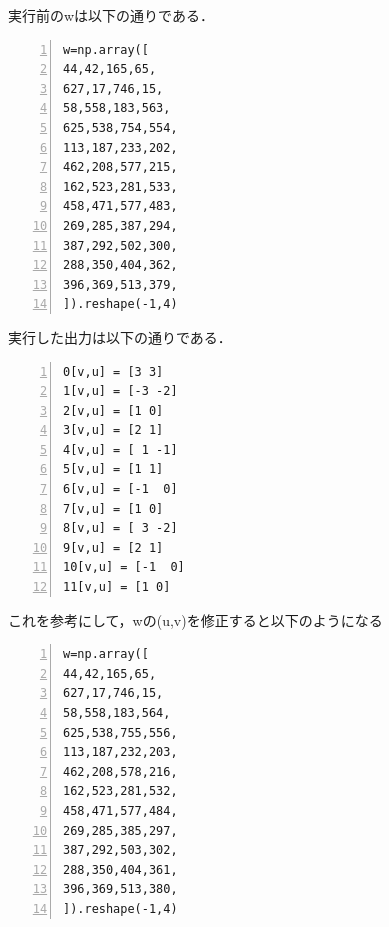 \documentclass[autodetect-engine,dvi=dvipdfmx,ja=standard,
               a4j,11pt]{bxjsarticle}
\begin{document}
実行前のwは以下の通りである．
\begin{Verbatim}[numbers=left, xleftmargin=10mm, numbersep=6pt,
                    fontsize=\small, baselinestretch=0.8]
  w=np.array([
44,42,165,65,
627,17,746,15,
58,558,183,563,
625,538,754,554,
113,187,233,202,
462,208,577,215,
162,523,281,533,
458,471,577,483,
269,285,387,294,
387,292,502,300,
288,350,404,362,
396,369,513,379,
]).reshape(-1,4)
\end{Verbatim}
実行した出力は以下の通りである．
\begin{Verbatim}[numbers=left, xleftmargin=10mm, numbersep=6pt,
                    fontsize=\small, baselinestretch=0.8]
0[v,u] = [3 3]
1[v,u] = [-3 -2]
2[v,u] = [1 0]
3[v,u] = [2 1]
4[v,u] = [ 1 -1]
5[v,u] = [1 1]
6[v,u] = [-1  0]
7[v,u] = [1 0]
8[v,u] = [ 3 -2]
9[v,u] = [2 1]
10[v,u] = [-1  0]
11[v,u] = [1 0]
\end{Verbatim}
これを参考にして，wの(u,v)を修正すると以下のようになる

\begin{Verbatim}[numbers=left, xleftmargin=10mm, numbersep=6pt,
                    fontsize=\small, baselinestretch=0.8]
  w=np.array([
44,42,165,65,
627,17,746,15,
58,558,183,564,
625,538,755,556,
113,187,232,203,
462,208,578,216,
162,523,281,532,
458,471,577,484,
269,285,385,297,
387,292,503,302,
288,350,404,361,
396,369,513,380,
]).reshape(-1,4)
\end{Verbatim}
\end{document}
